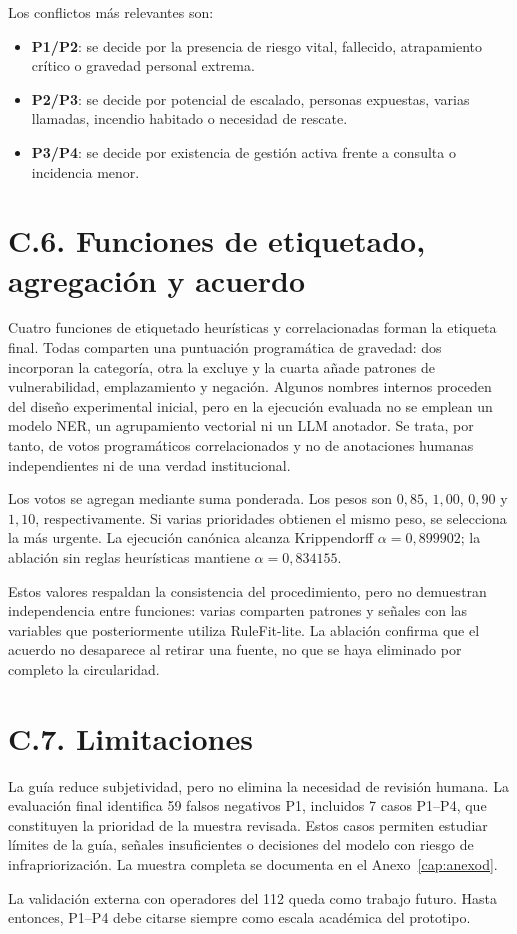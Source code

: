 Los conflictos más relevantes son:

\begin{itemize}
    \item \textbf{P1/P2}: se decide por la presencia de riesgo vital, fallecido,
    atrapamiento crítico o gravedad personal extrema.
    \item \textbf{P2/P3}: se decide por potencial de escalado, personas expuestas,
    varias llamadas, incendio habitado o necesidad de rescate.
    \item \textbf{P3/P4}: se decide por existencia de gestión activa frente a consulta
    o incidencia menor.
\end{itemize}

\section*{C.6. Funciones de etiquetado, agregación y acuerdo}

Cuatro funciones de etiquetado heurísticas y correlacionadas forman la etiqueta final.
Todas comparten una puntuación programática de gravedad: dos incorporan la categoría,
otra la excluye y la cuarta añade patrones de vulnerabilidad, emplazamiento y negación.
Algunos nombres internos proceden del diseño experimental inicial, pero en la ejecución
evaluada no se emplean un modelo NER, un agrupamiento vectorial ni un LLM anotador. Se
trata, por tanto, de votos programáticos correlacionados y no de anotaciones humanas
independientes ni de una verdad institucional.

Los votos se agregan mediante suma ponderada. Los pesos son \(0{,}85\), \(1{,}00\),
\(0{,}90\) y \(1{,}10\), respectivamente. Si varias prioridades obtienen el mismo
peso, se selecciona la más urgente. La ejecución canónica alcanza Krippendorff
\(\alpha = 0{,}899902\); la ablación sin reglas heurísticas mantiene
\(\alpha = 0{,}834155\).

Estos valores respaldan la consistencia del procedimiento, pero no demuestran
independencia entre funciones: varias comparten patrones y señales con las variables
que posteriormente utiliza RuleFit-lite. La ablación confirma que el acuerdo no
desaparece al retirar una fuente, no que se haya eliminado por completo la circularidad.

\section*{C.7. Limitaciones}

La guía reduce subjetividad, pero no elimina la necesidad de revisión humana. La
evaluación final identifica 59 falsos negativos P1, incluidos 7 casos P1--P4, que
constituyen la prioridad de la muestra revisada. Estos casos permiten estudiar
límites de la guía, señales insuficientes o decisiones del modelo con riesgo de
infrapriorización. La muestra completa se documenta en el
Anexo~\ref{cap:anexod}.

La validación externa con operadores del 112 queda como trabajo futuro. Hasta entonces,
P1--P4 debe citarse siempre como escala académica del prototipo.
